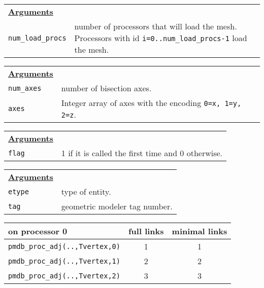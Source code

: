 {\newpage
\clearpage
\samepage \begin{tabular}{p{1.0in}p{4.9in}}
{\bf \underline{Arguments}} & \\  

{\tt num\_load\_procs} &  number of processors that will load the mesh. 
      Processors with id {\tt i=0..num\_load\_procs-1} load the mesh.

\end{tabular}
}

{\newpage
\clearpage
\samepage \begin{tabular}{p{1.0in}p{4.9in}}
{\bf \underline{Arguments}} & \\  

{\tt num\_axes}  &  number of bisection axes. \\  
\verb$axes$      &  Integer array of axes with 
                    the encoding \verb$0=x, 1=y, 2=z$. \\  

\end{tabular}
}

{\newpage
\clearpage
\samepage \begin{tabular}{p{1.0in}p{4.9in}}
{\bf \underline{Arguments}} & \\  

\verb$flag$ & 1 if it is called the first time and 0 otherwise.  \\  

\end{tabular}
}

{\newpage
\clearpage
\samepage \begin{tabular}{p{1.0in}p{4.9in}}
{\bf \underline{Arguments}} & \\  

\verb$etype$   & type of entity.  \\  
\verb$tag$     & geometric modeler tag number.  \\  

\end{tabular}
}

{\newpage
\clearpage
\samepage \begin{figure}[htb]
\centerline{
\vbox{}
}

\label{lab_fig_qu}
\end{figure}
}

{\newpage
\clearpage
\samepage \begin{tabular}{|l|c|c|} \hline
on processor 0      & full links  & minimal links  \\  \hline \hline 
{\tt pmdb\_proc\_adj(..,Tvertex,0)} &  1  & 1   \\  \hline
{\tt pmdb\_proc\_adj(..,Tvertex,1)} &  2  & 2   \\  \hline
{\tt pmdb\_proc\_adj(..,Tvertex,2)} &  3  & 3   \\  \hline
\end{tabular}
}

